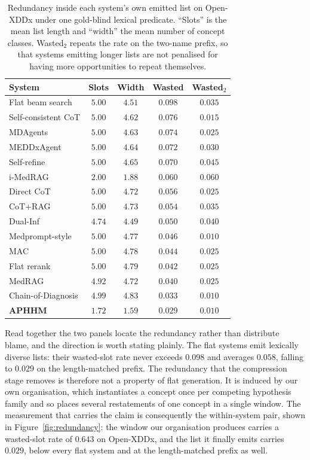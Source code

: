 \documentclass[letterpaper]{article}
\begin{document}
\begin{table}[tb]
\centering
\footnotesize
\setlength{\tabcolsep}{4pt}
\begin{tabular}{@{}lcccc@{}}
\toprule
System & Slots & Width & Wasted & Wasted$_2$ \\
\midrule
Flat beam search      & $5.00$ & $4.51$ & $0.098$ & $0.035$ \\
Self-consistent CoT   & $5.00$ & $4.62$ & $0.076$ & $0.015$ \\
MDAgents              & $5.00$ & $4.63$ & $0.074$ & $0.025$ \\
MEDDxAgent            & $5.00$ & $4.64$ & $0.072$ & $0.030$ \\
Self-refine           & $5.00$ & $4.65$ & $0.070$ & $0.045$ \\
i-MedRAG              & $2.00$ & $1.88$ & $0.060$ & $0.060$ \\
Direct CoT            & $5.00$ & $4.72$ & $0.056$ & $0.025$ \\
CoT+RAG               & $5.00$ & $4.73$ & $0.054$ & $0.035$ \\
Dual-Inf              & $4.74$ & $4.49$ & $0.050$ & $0.040$ \\
Medprompt-style       & $5.00$ & $4.77$ & $0.046$ & $0.010$ \\
MAC                   & $5.00$ & $4.78$ & $0.044$ & $0.025$ \\
Flat rerank           & $5.00$ & $4.79$ & $0.042$ & $0.025$ \\
MedRAG                & $4.92$ & $4.72$ & $0.040$ & $0.025$ \\
Chain-of-Diagnosis    & $4.99$ & $4.83$ & $0.033$ & $0.010$ \\
\midrule
\textbf{APHHM}        & $1.72$ & $1.59$ & $\mathbf{0.029}$ & $0.010$ \\
\bottomrule
\end{tabular}
\caption{Redundancy inside each system's own emitted list on Open-XDDx under one gold-blind lexical predicate. ``Slots'' is the mean list length and ``width'' the mean number of concept classes. Wasted$_2$ repeats the rate on the two-name prefix, so that systems emitting longer lists are not penalised for having more opportunities to repeat themselves.}
\label{tab:slots-cross}
\end{table}

Read together the two panels locate the redundancy rather than distribute blame, and the direction is worth stating plainly.
The flat systems emit lexically diverse lists: their wasted-slot rate never exceeds $0.098$ and averages $0.058$, falling to $0.029$ on the length-matched prefix.
The redundancy that the compression stage removes is therefore not a property of flat generation.
It is induced by our own organisation, which instantiates a concept once per competing hypothesis family and so places several restatements of one concept in a single window.
The measurement that carries the claim is consequently the within-system pair, shown in Figure~\ref{fig:redundancy}: the window our organisation produces carries a wasted-slot rate of $0.643$ on Open-XDDx, and the list it finally emits carries $0.029$, below every flat system and at the length-matched prefix as well.
\end{document}
